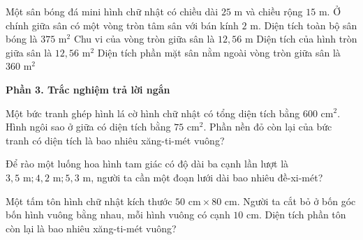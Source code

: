 \begin{ex} %
Một sân bóng đá mini hình chữ nhật có chiều dài $25\text{ m}$ và chiều rộng $15\text{ m}$. Ở chính giữa sân có một vòng tròn tâm sân với bán kính $2\text{ m}$.
\choiceTF
{\True Diện tích toàn bộ sân bóng là $375\text{ m}^2$}
{\True Chu vi của vòng tròn giữa sân là $12{,}56\text{ m}$}
{\True Diện tích của hình tròn giữa sân là $12{,}56\text{ m}^2$}
{Diện tích phần mặt sân nằm ngoài vòng tròn giữa sân là $360\text{ m}^2$}
\end{ex}

\textbf{Phần 3. Trắc nghiệm trả lời ngắn}

\begin{ex} %
Một bức tranh ghép hình lá cờ hình chữ nhật có tổng diện tích bằng $600\text{ cm}^2$. Hình ngôi sao ở giữa có diện tích bằng $75\text{ cm}^2$. Phần nền đỏ còn lại của bức tranh có diện tích là bao nhiêu xăng-ti-mét vuông?
\end{ex}

\begin{ex} %
Để rào một luống hoa hình tam giác có độ dài ba cạnh lần lượt là $3{,}5\text{ m}; 4{,}2\text{ m}; 5{,}3\text{ m}$, người ta cần một đoạn lưới dài bao nhiêu đề-xi-mét?
\end{ex}

\begin{ex} %
Một tấm tôn hình chữ nhật kích thước $50\text{ cm} \times 80\text{ cm}$. Người ta cắt bỏ ở bốn góc bốn hình vuông bằng nhau, mỗi hình vuông có cạnh $10\text{ cm}$. Diện tích phần tôn còn lại là bao nhiêu xăng-ti-mét vuông?
\end{ex}

